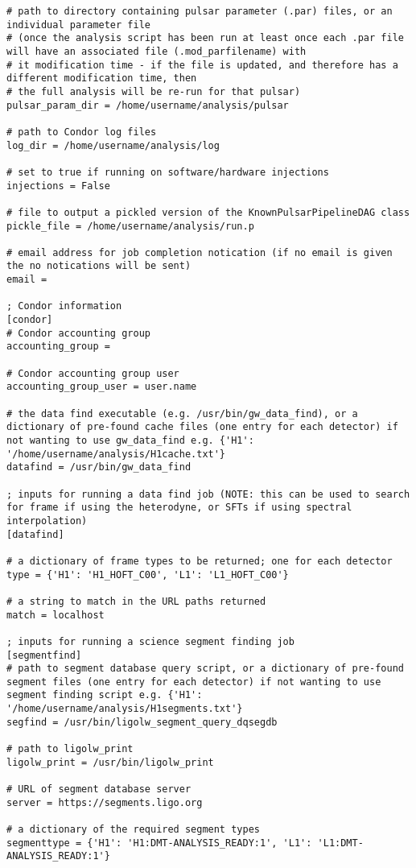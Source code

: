 \begin{lstlisting}[frame=single,basicstyle=\tiny\ttfamily]
# path to directory containing pulsar parameter (.par) files, or an individual parameter file
# (once the analysis script has been run at least once each .par file will have an associated file (.mod_parfilename) with
# it modification time - if the file is updated, and therefore has a different modification time, then
# the full analysis will be re-run for that pulsar)
pulsar_param_dir = /home/username/analysis/pulsar

# path to Condor log files
log_dir = /home/username/analysis/log

# set to true if running on software/hardware injections
injections = False

# file to output a pickled version of the KnownPulsarPipelineDAG class
pickle_file = /home/username/analysis/run.p

# email address for job completion notication (if no email is given the no notications will be sent)
email =

; Condor information
[condor]
# Condor accounting group
accounting_group =

# Condor accounting group user
accounting_group_user = user.name

# the data find executable (e.g. /usr/bin/gw_data_find), or a dictionary of pre-found cache files (one entry for each detector) if not wanting to use gw_data_find e.g. {'H1': '/home/username/analysis/H1cache.txt'}
datafind = /usr/bin/gw_data_find

; inputs for running a data find job (NOTE: this can be used to search for frame if using the heterodyne, or SFTs if using spectral interpolation)
[datafind]

# a dictionary of frame types to be returned; one for each detector
type = {'H1': 'H1_HOFT_C00', 'L1': 'L1_HOFT_C00'}

# a string to match in the URL paths returned
match = localhost

; inputs for running a science segment finding job
[segmentfind]
# path to segment database query script, or a dictionary of pre-found segment files (one entry for each detector) if not wanting to use segment finding script e.g. {'H1': '/home/username/analysis/H1segments.txt'}
segfind = /usr/bin/ligolw_segment_query_dqsegdb

# path to ligolw_print
ligolw_print = /usr/bin/ligolw_print

# URL of segment database server
server = https://segments.ligo.org

# a dictionary of the required segment types
segmenttype = {'H1': 'H1:DMT-ANALYSIS_READY:1', 'L1': 'L1:DMT-ANALYSIS_READY:1'}


\end{lstlisting}
